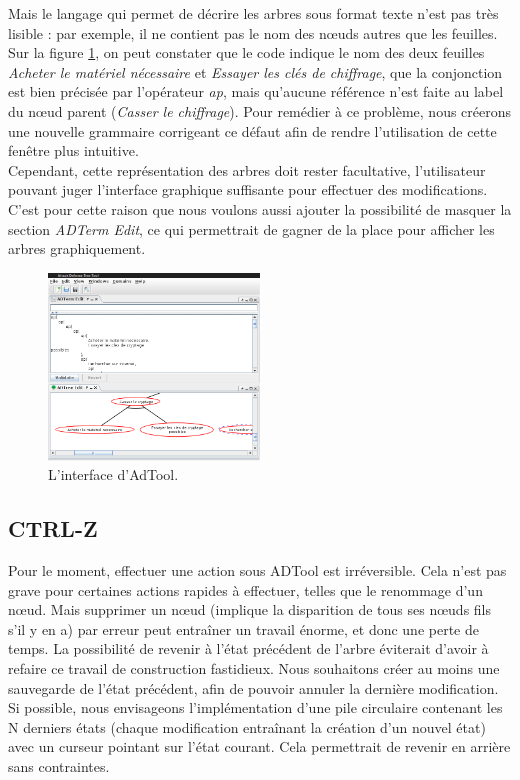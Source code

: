 	Mais le langage qui permet de décrire les arbres sous format texte n'est pas très lisible : par exemple, il ne contient pas le nom des nœuds autres que les feuilles. Sur la figure \ref{fig:int_adTool}, on peut constater que le code indique le nom des deux feuilles \textit{Acheter le matériel nécessaire} et \textit{Essayer les clés de chiffrage}, que la conjonction est bien précisée par l'opérateur \textit{ap}, mais qu'aucune référence n'est faite au label du nœud parent (\textit{Casser le chiffrage}). Pour remédier à ce problème, nous créerons une nouvelle grammaire corrigeant ce défaut afin de rendre l'utilisation de cette fenêtre plus intuitive.\\
	
	Cependant, cette représentation des arbres doit rester facultative, l'utilisateur pouvant juger l'interface graphique suffisante pour effectuer des modifications. C'est pour cette raison que nous voulons aussi ajouter la possibilité de masquer la section \emph{ADTerm Edit}, ce qui permettrait de gagner de la place pour afficher les arbres graphiquement.

	\begin{figure}
		\centering
		\includegraphics[width=0.5\textwidth]{figure/interface_adtool.png}
		\caption{L'interface d'AdTool.}
		\label{fig:int_adTool}
	\end{figure}
	
	\subsection{CTRL-Z}
	
	Pour le moment, effectuer une action sous ADTool est irréversible. Cela n'est pas grave pour certaines actions rapides à effectuer, telles que le renommage d'un nœud. Mais supprimer un nœud (implique la disparition de tous ses nœuds fils s'il y en a) par erreur peut entraîner un travail énorme, et donc une perte de temps. La possibilité de revenir à l'état précédent de l'arbre éviterait d'avoir à refaire ce travail de construction fastidieux. Nous souhaitons créer au moins une sauvegarde de l'état précédent, afin de pouvoir annuler la dernière modification. Si possible, nous envisageons l'implémentation d'une pile circulaire contenant les N derniers états (chaque modification entraînant la création d'un nouvel état) avec un curseur pointant sur l'état courant. Cela permettrait de revenir en arrière sans contraintes.


